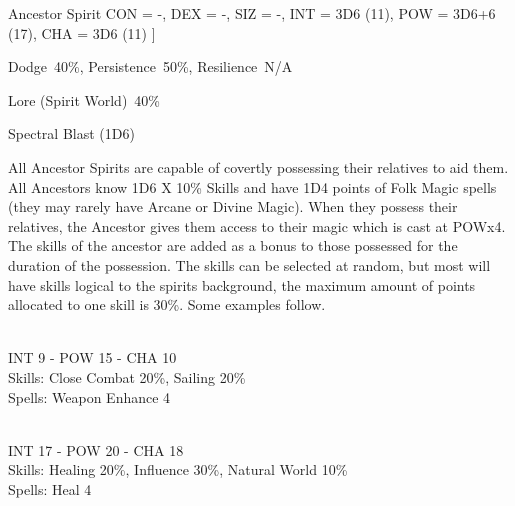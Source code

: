 \begin{samepage}
\begin{monsterbox}{Ancestor Spirit}
		CON = -,
		DEX = -,
		SIZ = -,
		INT = 3D6    (11),
		POW = 3D6+6  (17),
		CHA = 3D6    (11)
	]
	\rpghline%
	\begin{rpg-monsteraction}[Resistances]
		Dodge~40\%, Persistence~50\%, Resilience~N/A
	\end{rpg-monsteraction}
	\begin{rpg-monsteraction}[Knowledge]
		Lore (Spirit World)~40\%
	\end{rpg-monsteraction}
	\begin{rpg-monsteraction}
		Spectral Blast (1D6)
	\end{rpg-monsteraction}
	\begin{rpg-monsteraction}
		All Ancestor Spirits are capable of covertly possessing their relatives to aid them. All Ancestors know 1D6 X 10\% Skills and have 1D4 points of Folk Magic spells (they may rarely have Arcane or Divine Magic). When they possess their relatives, the Ancestor gives them access to their magic which is cast at POWx4. The skills of the ancestor are added as a bonus to those possessed for the duration of the possession. The skills can be selected at random, but most will have skills logical to the spirits background, the maximum amount of points allocated to one skill is 30\%. Some examples follow.
	\end{rpg-monsteraction}
	\begin{rpg-monsteraction}
		\\INT 9 - POW 15 - CHA 10\\
		Skills: Close Combat 20\%, Sailing 20\%\\
                Spells: Weapon Enhance 4
	\end{rpg-monsteraction}

	\begin{rpg-monsteraction}
		\\INT 17 - POW 20 - CHA 18\\
		Skills: Healing 20\%, Influence 30\%, Natural World 10\%\\
                Spells: Heal 4
	\end{rpg-monsteraction}
\end{monsterbox}
\end{samepage}

